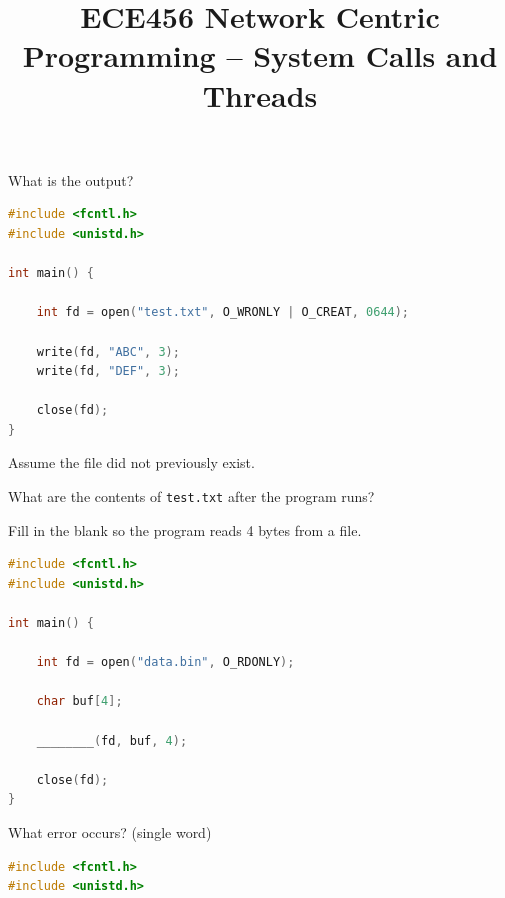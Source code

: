 

\title{ECE456 Network Centric Programming -- System Calls and Threads}
\date{}
\author{}



\maketitle

\begin{questions}

	\question[6] What is the output?

	\begin{lstlisting}[language=C]
#include <fcntl.h>
#include <unistd.h>

int main() {

    int fd = open("test.txt", O_WRONLY | O_CREAT, 0644);

    write(fd, "ABC", 3);
    write(fd, "DEF", 3);

    close(fd);
}
\end{lstlisting}

	Assume the file did not previously exist.

	What are the contents of \texttt{test.txt} after the program runs?

	\vspace{2cm}

	\question[6]

	Fill in the blank so the program reads 4 bytes from a file.

	\begin{lstlisting}[language=C]
#include <fcntl.h>
#include <unistd.h>

int main() {

    int fd = open("data.bin", O_RDONLY);

    char buf[4];

    ________(fd, buf, 4);

    close(fd);
}
\end{lstlisting}

	\vspace{1cm}

	\question[6]

	What error occurs? (single word)

	\begin{lstlisting}[language=C]
#include <fcntl.h>
#include <unistd.h>


\end{lstlisting}
\end{questions}

